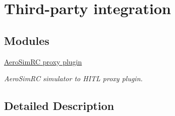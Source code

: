 \hypertarget{group__rd_party}{\section{Third-\/party integration}
\label{group__rd_party}
}
\subsection*{Modules}
\begin{DoxyCompactItemize}
\item 
\hyperlink{group___aero_sim_r_c}{Aero\-Sim\-R\-C proxy plugin}
\begin{DoxyCompactList}\small\item\em Aero\-Sim\-R\-C simulator to H\-I\-T\-L proxy plugin. \end{DoxyCompactList}\end{DoxyCompactItemize}


\subsection{Detailed Description}
